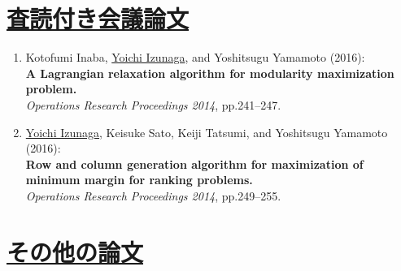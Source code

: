 \documentclass[dvipdfmx,9pt,a4paper]{article}
\begin{document}
\section*{\underline{査読付き会議論文}}

\begin{enumerate}

\item Kotofumi Inaba, \underline{Yoichi Izunaga}, and Yoshitsugu Yamamoto (2016):\\
{\bf A Lagrangian relaxation algorithm for modularity maximization problem.}\\
{\it Operations Research Proceedings 2014}, pp.241--247.

\item \underline{Yoichi Izunaga}, Keisuke Sato, Keiji Tatsumi, and Yoshitsugu Yamamoto (2016):\\
{\bf Row and column generation algorithm for maximization of minimum margin for ranking problems.}\\
{\it Operations Research Proceedings 2014}, pp.249--255.

\end{enumerate}


\section*{\underline{その他の論文}}
\end{document}
